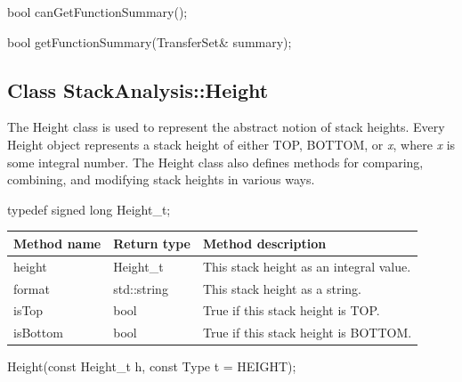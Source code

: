 \begin{apient}
	bool canGetFunctionSummary();
\end{apient}

\begin{apient}
	bool getFunctionSummary(TransferSet& summary);
\end{apient}




\subsection{Class StackAnalysis::Height}

The Height class is used to represent the abstract notion of stack heights.  Every Height object represents a stack height of either TOP, BOTTOM, or \emph{x}, where \emph{x} is some integral number.  The Height class also defines methods for comparing, combining, and modifying stack heights in various ways.

\begin{apient}
typedef signed long Height_t;
\end{apient}

\begin{tabularx}{\textwidth}{llX}
	\toprule
	Method name & Return type & Method description \\
	\midrule
	height & Height\_t & This stack height as an integral value.\\
	format & std::string & This stack height as a string.\\
	isTop & bool & True if this stack height is TOP.\\
	isBottom & bool & True if this stack height is BOTTOM.\\
	\bottomrule
\end{tabularx}

\begin{apient}
Height(const Height_t h, const Type t = HEIGHT);
\end{apient}

